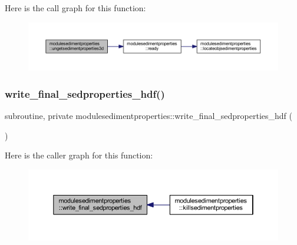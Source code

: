 Here is the call graph for this function\+:\nopagebreak
\begin{figure}[H]
\begin{center}
\leavevmode
\includegraphics[width=350pt]{namespacemodulesedimentproperties_aee146c5fb6ec7343cd2af683f76043b9_cgraph}
\end{center}
\end{figure}
\mbox{\label{namespacemodulesedimentproperties_ac2dfd3d9cf57dcc8a9d3533203128931}} 
\subsubsection{\texorpdfstring{write\+\_\+final\+\_\+sedproperties\+\_\+hdf()}{write\_final\_sedproperties\_hdf()}}
{\footnotesize\ttfamily subroutine, private modulesedimentproperties\+::write\+\_\+final\+\_\+sedproperties\+\_\+hdf (\begin{DoxyParamCaption}{ }\end{DoxyParamCaption})\hspace{0.3cm}{\ttfamily [private]}}

Here is the caller graph for this function\+:\nopagebreak
\begin{figure}[H]
\begin{center}
\leavevmode
\includegraphics[width=350pt]{namespacemodulesedimentproperties_ac2dfd3d9cf57dcc8a9d3533203128931_icgraph}
\end{center}
\end{figure}


